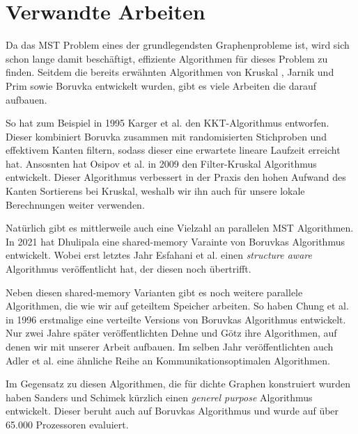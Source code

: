 \section{Verwandte Arbeiten}\label{RelatedWork}

Da das MST Problem eines der grundlegendsten Graphenprobleme ist, wird sich schon lange damit beschäftigt, effiziente Algorithmen für dieses Problem zu finden. Seitdem die bereits erwähnten Algorithmen von Kruskal \cite{kruskal1956shortest}, Jarnik und Prim \cite{prim1957shortest} sowie Boruvka \cite{boruuvka1926jistem} entwickelt wurden, gibt es viele Arbeiten die darauf aufbauen.

So hat zum Beispiel in 1995 Karger et al. \cite{karger1995randomized} den KKT-Algorithmus entworfen. Dieser kombiniert Boruvka zusammen mit randomisierten Stichproben und effektivem Kanten filtern, sodass dieser eine erwartete lineare Laufzeit erreicht hat.
Ansosnten hat Osipov et al. \cite{osipov2009filter} in 2009 den Filter-Kruskal Algorithmus entwickelt. 
Dieser Algorithmus verbessert in der Praxis den hohen Aufwand des Kanten Sortierens bei Kruskal, weshalb wir ihn auch für unsere lokale Berechnungen weiter verwenden. 

Natürlich gibt es mittlerweile auch eine Vielzahl an parallelen MST Algorithmen. In 2021 hat Dhulipala \cite{dhulipala2021theoretically} eine shared-memory Varainte von Boruvkas Algorithmus entwickelt. Wobei erst letztes Jahr Esfahani et al. \cite{koohi2022mastiff} einen \textit{structure aware} Algorithmus veröffentlicht hat, der diesen noch übertrifft.

Neben diesen shared-memory Varianten gibt es noch weitere parallele Algorithmen, die wie wir auf geteiltem Speicher arbeiten. So haben Chung et al. \cite{chung1996parallel} in 1996 erstmalige eine verteilte Versions von Boruvkas Algorithmus entwickelt. Nur zwei Jahre später veröffentlichten Dehne und Götz \cite{dehne1998practical} ihre Algorithmen, auf denen wir mit unserer Arbeit aufbauen.
Im selben Jahr veröffentlichten auch Adler et al. \cite{adler1998communication} eine ähnliche Reihe an Kommunikationsoptimalen Algorithmen.

Im Gegensatz zu diesen Algorithmen, die für dichte Graphen konstruiert wurden haben Sanders und Schimek \cite{sanders2023engineering} kürzlich einen \textit{generel purpose} Algorithmus entwickelt. Dieser beruht auch auf Boruvkas Algorithmus und wurde auf über 65.000 Prozessoren evaluiert.

